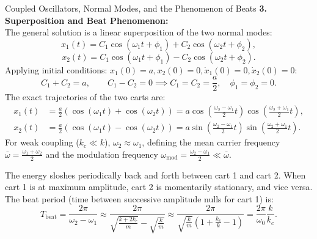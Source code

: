 \begin{workedexample}{Coupled Oscillators, Normal Modes, and the Phenomenon of Beats}
\textbf{3. Superposition and Beat Phenomenon:}\\
The general solution is a linear superposition of the two normal modes:
\[
x_1(t) = C_1 \cos(\omega_1 t + \phi_1) + C_2 \cos(\omega_2 t + \phi_2),
\]
\[
x_2(t) = C_1 \cos(\omega_1 t + \phi_1) - C_2 \cos(\omega_2 t + \phi_2).
\]
Applying initial conditions: $x_1(0) = a, x_2(0) = 0, \dot{x}_1(0) = 0, \dot{x}_2(0) = 0$:
\[
C_1 + C_2 = a, \qquad C_1 - C_2 = 0 \implies C_1 = C_2 = \frac{a}{2}, \quad \phi_1 = \phi_2 = 0.
\]
The exact trajectories of the two carts are:
\begin{align*}
x_1(t) &= \frac{a}{2}\left( \cos(\omega_1 t) + \cos(\omega_2 t) \right) = a \cos\left(\frac{\omega_2 - \omega_1}{2} t\right) \cos\left(\frac{\omega_2 + \omega_1}{2} t\right), \\
x_2(t) &= \frac{a}{2}\left( \cos(\omega_1 t) - \cos(\omega_2 t) \right) = a \sin\left(\frac{\omega_2 - \omega_1}{2} t\right) \sin\left(\frac{\omega_2 + \omega_1}{2} t\right).
\end{align*}
For weak coupling ($k_c \ll k$), $\omega_2 \approx \omega_1$, defining the mean carrier frequency $\bar{\omega} = \frac{\omega_1 + \omega_2}{2}$ and the modulation frequency $\omega_{\text{mod}} = \frac{\omega_2 - \omega_1}{2} \ll \bar{\omega}$.

The energy sloshes periodically back and forth between cart 1 and cart 2. When cart 1 is at maximum amplitude, cart 2 is momentarily stationary, and vice versa.
The beat period (time between successive amplitude nulls for cart 1) is:
\[
T_{\text{beat}} = \frac{2\pi}{\omega_2 - \omega_1} \approx \frac{2\pi}{\sqrt{\frac{k+2k_c}{m}} - \sqrt{\frac{k}{m}}} \approx \frac{2\pi}{\sqrt{\frac{k}{m}}\left(1 + \frac{k_c}{k} - 1\right)} = \frac{2\pi}{\omega_0} \frac{k}{k_c}.
\]
\end{workedexample}
